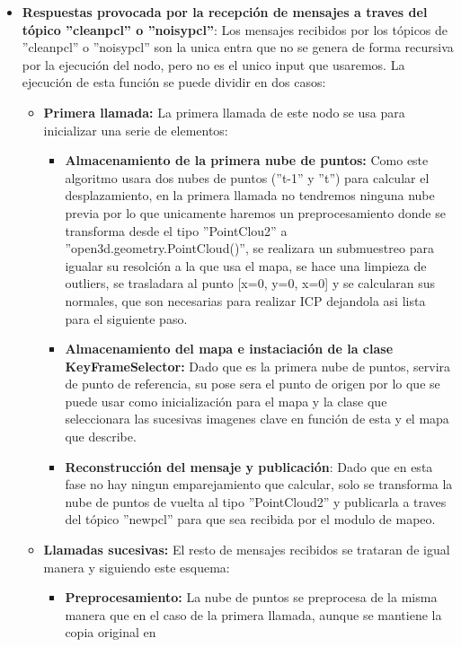 \documentclass[12pt, a4paper, twoside]{article}
\begin{document}
\begin{itemize}
\begin{itemize}
  \end{itemize}
  \item \textbf{Respuestas provocada por la recepción de mensajes a traves del tópico ''clean\textunderscore pcl'' o ''noisy\textunderscore pcl''}:
  Los mensajes recibidos por los tópicos de ''clean\textunderscore pcl'' o ''noisy\textunderscore pcl'' son la unica entra que no se genera de forma recursiva por 
  la ejecución del nodo, pero no es el unico input que usaremos. La ejecución de esta función se puede dividir en dos casos:
  \begin{itemize}
    \item \textbf{Primera llamada:} La primera llamada de este nodo se usa para inicializar una serie de elementos:
    \begin{itemize}
      \item \textbf{Almacenamiento de la primera nube de puntos:} Como este algoritmo usara dos nubes de puntos (''t-1'' y ''t'') para calcular el desplazamiento, en 
      la primera llamada no tendremos ninguna nube previa por lo que unicamente haremos un preprocesamiento donde se transforma desde el tipo ''PointClou2'' a 
      ''open3d.geometry.PointCloud()'', se realizara un submuestreo para igualar su resolción a la que usa el mapa, se hace una limpieza de outliers, se trasladara al 
      punto [x=0, y=0, x=0] y se calcularan sus normales, que son necesarias para realizar ICP dejandola asi lista para el siguiente paso.
      \item \textbf{Almacenamiento del mapa e instaciación de la clase KeyFrameSelector:} Dado que es la primera nube de puntos, servira de punto de referencia, su pose 
      sera el punto de origen por lo que se puede usar como inicialización para el mapa y la clase que seleccionara las sucesivas imagenes clave en función de esta y el 
      mapa que describe.
      \item \textbf{Reconstrucción del mensaje y publicación}: Dado que en esta fase no hay ningun emparejamiento que calcular, solo se transforma la nube de puntos 
      de vuelta al tipo ''PointCloud2'' y publicarla a traves del tópico ''new\textunderscore pcl'' para que sea recibida por el modulo de mapeo.
    \end{itemize}
    \item \textbf{Llamadas sucesivas:} El resto de mensajes recibidos se trataran de igual manera y siguiendo este esquema:
    \begin{itemize}
      \item \textbf{Preprocesamiento:} La nube de puntos se preprocesa de la misma manera que en el caso de la primera llamada, aunque se mantiene la copia original en 

\end{itemize}
\end{itemize}
\end{itemize}
\end{document}
